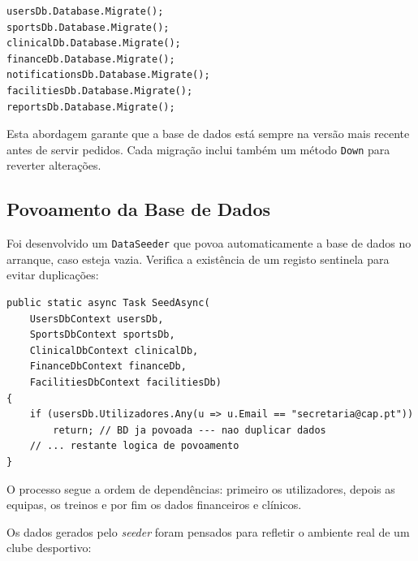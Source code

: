 \begin{lstlisting}[language={[Sharp]C},basicstyle=\ttfamily\small,breaklines=true,frame=single,caption={Aplicação automática das migrações no arranque da API.},label={lst:migrate}]
usersDb.Database.Migrate();
sportsDb.Database.Migrate();
clinicalDb.Database.Migrate();
financeDb.Database.Migrate();
notificationsDb.Database.Migrate();
facilitiesDb.Database.Migrate();
reportsDb.Database.Migrate();
\end{lstlisting}

Esta abordagem garante que a base de dados está sempre na versão mais recente antes de servir pedidos. Cada migração inclui também um método \texttt{Down} para reverter alterações.

\subsection{Povoamento da Base de Dados}

Foi desenvolvido um \texttt{DataSeeder} que povoa automaticamente a base de dados no arranque, caso esteja vazia. Verifica a existência de um registo sentinela para evitar duplicações:

\begin{lstlisting}[language={[Sharp]C},basicstyle=\ttfamily\small,breaklines=true,frame=single,caption={Verificação de idempotência no \texttt{DataSeeder}.},label={lst:seeder-check}]
public static async Task SeedAsync(
    UsersDbContext usersDb,
    SportsDbContext sportsDb,
    ClinicalDbContext clinicalDb,
    FinanceDbContext financeDb,
    FacilitiesDbContext facilitiesDb)
{
    if (usersDb.Utilizadores.Any(u => u.Email == "secretaria@cap.pt"))
        return; // BD ja povoada --- nao duplicar dados
    // ... restante logica de povoamento
}
\end{lstlisting}

O processo segue a ordem de dependências: primeiro os utilizadores, depois as equipas, os treinos e por fim os dados financeiros e clínicos.

Os dados gerados pelo \textit{seeder} foram pensados para refletir o ambiente real de um clube desportivo:

